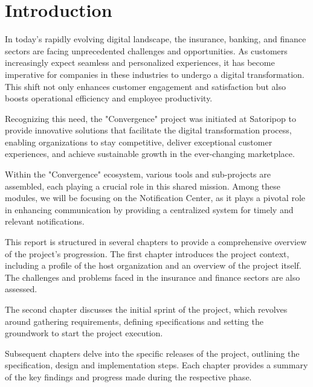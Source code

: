 \chapter*{Introduction}

In today's rapidly evolving digital landscape, the insurance, banking, and finance sectors
are facing unprecedented challenges and opportunities. As customers increasingly expect seamless
and personalized experiences, it has become imperative for companies in these industries to undergo
a digital transformation. This shift not only enhances customer engagement and satisfaction but also
boosts operational efficiency and employee productivity.

Recognizing this need, the "Convergence" project was initiated at Satoripop to provide innovative solutions
that facilitate the digital transformation process, enabling organizations to stay competitive,
deliver exceptional customer experiences, and achieve sustainable growth in the ever-changing
marketplace.

Within the "Convergence" ecosystem, various tools and sub-projects are assembled, each playing
a crucial role in this shared mission. Among these modules, we will be focusing on the Notification
Center, as it plays a pivotal role in enhancing communication by providing a centralized system
for timely and relevant notifications.

This report is structured in several chapters to provide a comprehensive overview of the project's
progression. The first chapter introduces the project context, including a profile of the
host organization and an overview of the project itself. The challenges and problems faced in the
insurance and finance sectors are also assessed.

The second chapter discusses the initial sprint of the project, which revolves around gathering
requirements, defining specifications and setting the groundwork to start the project execution.

Subsequent chapters delve into the specific releases of the project, outlining the specification,
design and implementation steps. Each chapter provides a summary of the key findings and progress
made during the respective phase.